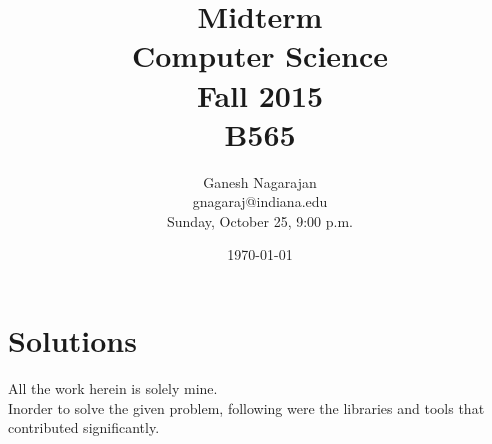\documentclass{article}
\begin{document}
\title{Midterm\\ Computer Science \\ Fall 2015\\ B565}         %
\author{Ganesh Nagarajan\\gnagaraj@indiana.edu\\ Sunday, October 25, 9:00 p.m.}        %
\date{\today}          %
\maketitle


\makeatother     %



\pagestyle{plain}
\section*{Solutions}
All the work herein is solely mine.\\
Inorder to solve the given problem, following were the libraries and tools that contributed significantly.
\end{document}
